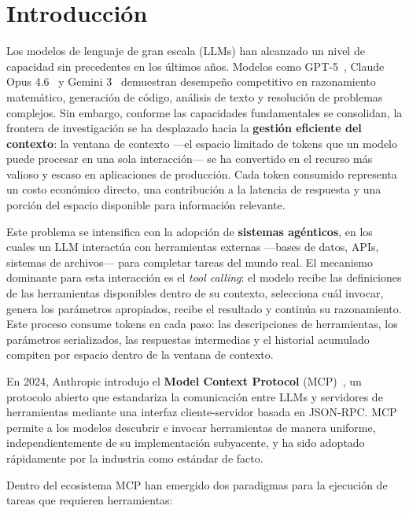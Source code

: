 \documentclass[runningheads]{llncs}
\begin{document}
\section{Introducci\'on}
\label{sec:intro}

Los modelos de lenguaje de gran escala (LLMs) han alcanzado un nivel de
capacidad sin precedentes en los \'ultimos a\~nos. Modelos como GPT-5~\cite{ref_gpt5},
Claude Opus 4.6~\cite{ref_opus} y Gemini 3~\cite{ref_gemini3} demuestran
desempe\~no competitivo en razonamiento matem\'atico, generaci\'on de c\'odigo,
an\'alisis de texto y resoluci\'on de problemas complejos. Sin embargo, conforme
las capacidades fundamentales se consolidan, la frontera de investigaci\'on se
ha desplazado hacia la \textbf{gesti\'on eficiente del contexto}: la ventana de
contexto ---el espacio limitado de tokens que un modelo puede procesar en una
sola interacci\'on--- se ha convertido en el recurso m\'as valioso y escaso en
aplicaciones de producci\'on. Cada token consumido representa un costo econ\'omico
directo, una contribuci\'on a la latencia de respuesta y una porci\'on del
espacio disponible para informaci\'on relevante.

Este problema se intensifica con la adopci\'on de \textbf{sistemas ag\'enticos},
en los cuales un LLM interact\'ua con herramientas externas ---bases de datos,
APIs, sistemas de archivos--- para completar tareas del mundo real. El mecanismo
dominante para esta interacci\'on es el \textit{tool calling}: el modelo recibe
las definiciones de las herramientas disponibles dentro de su contexto,
selecciona cu\'al invocar, genera los par\'ametros apropiados, recibe el resultado
y contin\'ua su razonamiento. Este proceso consume tokens en cada paso: las
descripciones de herramientas, los par\'ametros serializados, las respuestas
intermedias y el historial acumulado compiten por espacio dentro de la ventana
de contexto.

En 2024, Anthropic introdujo el \textbf{Model Context Protocol} (MCP)~\cite{ref_mcp},
un protocolo abierto que estandariza la comunicaci\'on entre LLMs y servidores de
herramientas mediante una interfaz cliente-servidor basada en JSON-RPC. MCP
permite a los modelos descubrir e invocar herramientas de manera uniforme,
independientemente de su implementaci\'on subyacente, y ha sido adoptado
r\'apidamente por la industria como est\'andar de facto.

Dentro del ecosistema MCP han emergido dos paradigmas para la ejecuci\'on de
tareas que requieren herramientas:
\end{document}
